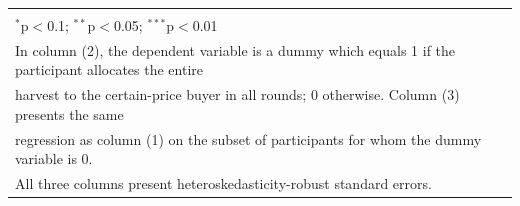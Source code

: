 \begin{table}[!htbp]
\begin{tabular}{@{\extracolsep{5pt}}lccc}
\hline 
\hline \\[-1.8ex] 
\multicolumn{4}{l}{$^{*}$p$<$0.1; $^{**}$p$<$0.05; $^{***}$p$<$0.01} \\ 
\multicolumn{4}{l}{In column (2), the dependent variable is a dummy which equals 1 if the participant allocates the entire} \\ 
\multicolumn{4}{l}{harvest to the certain-price buyer in all rounds; 0 otherwise. Column (3) presents the same} \\ 
\multicolumn{4}{l}{regression as column (1) on the subset of participants for whom the dummy variable is 0.} \\ 
\multicolumn{4}{l}{All three columns present heteroskedasticity-robust standard errors.} \\ 
\end{tabular} 
\end{table} 
